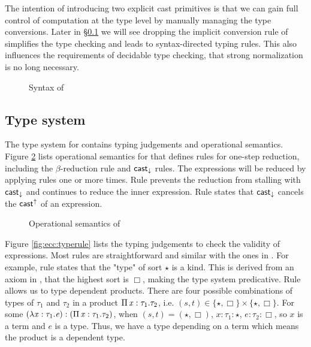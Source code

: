 The intention of introducing two explicit cast primitives is that we can gain full control of computation at the type level by manually managing the type conversions. Later in \S \ref{sec:ecc:type} we will see dropping the implicit conversion rule of \cc simplifies the type checking and leads to syntax-directed typing rules. This also influences the requirements of decidable type checking, that strong normalization is no long necessary.

\begin{figure}[ht]
	\gram{\otte\ottinterrule
		\ottG\ottinterrule
		\ottv}
	\caption{Syntax of \name}
	\label{fig:core:syntax}
\end{figure}

\subsection{Type system}\label{sec:ecc:type}
The type system for \expcc contains typing judgements and operational semantics. Figure \ref{fig:ecc:dynsem} lists operational semantics for \expcc that defines rules for one-step reduction, including the $\beta$-reduction rule and $ \mathsf{cast}_{\downarrow} $ rules. The expressions will be reduced by applying rules one or more times. Rule  prevents the reduction from stalling with $ \mathsf{cast}_{\downarrow} $ and continues to reduce the inner expression. Rule  states that $ \mathsf{cast}_{\downarrow} $ cancels the $ \mathsf{cast}^{\uparrow} $ of an expression.

\begin{figure}[ht]
	\ottdefnstep{}
	\caption{Operational semantics of \expcc}
	\label{fig:ecc:dynsem}
\end{figure}

Figure \ref{fig:ecc:typerule} lists the typing judgements to check the validity of expressions. Most rules are straightforward and similar with the ones in \cc. For example, rule  states that the "type" of sort $\star$ is a kind. This is derived from an axiom in \cc, that the highest sort is $\Box$, making the type system predicative. Rule  allows us to type dependent products. There are four possible combinations of types of $\tau_{{\mathrm{1}}}$ and $\tau_{{\mathrm{2}}}$ in a product $\Pi \, \mathit{x}  :  \tau_{{\mathrm{1}}}  .  \tau_{{\mathrm{2}}}$, i.e. $(s,t) \in \{\star, \Box\} \times \{\star, \Box\}$. For some $(\lambda  \mathit{x}  :  \tau_{{\mathrm{1}}}  .  \mathit{e}):(\Pi \, \mathit{x}  :  \tau_{{\mathrm{1}}}  .  \tau_{{\mathrm{2}}})$, when $(s,t)=(\star,\Box)$, $x:\tau_{{\mathrm{1}}}:\star$, $e:\tau_{{\mathrm{2}}}:\Box$, so $x$ is a term and $e$ is a type. Thus, we have a type depending on a term which means the product is a dependent type.

